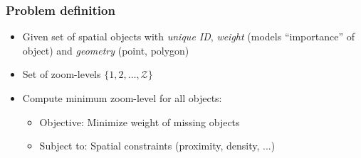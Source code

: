 \documentclass{beamer}
\begin{document}
\frame
{
  \frametitle{Problem definition}
  \begin{itemize}
  \item Given set of spatial objects with \emph{unique ID}, \emph{weight} (models ``importance'' of object) and \emph{geometry} (point, polygon)
  \item Set of zoom-levels $\lbrace 1, 2, \dots, \mathcal{Z} \rbrace$
  \item Compute minimum zoom-level for all objects:
  \begin{itemize}
  \item Objective: Minimize weight of missing objects
  \item Subject to: Spatial constraints (proximity, density, ...)
  \end{itemize}
  \end{itemize}
  \begin{center}
  \end{center}
}
\end{document}
